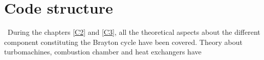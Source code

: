 \chapter{Code structure}
\quad\, During the chapters \ref{C2} and \ref{C3}, all the theoretical aspects about the different component constituting the Brayton cycle have been covered. Theory about turbomachines, combustion chamber and heat exchangers have 
